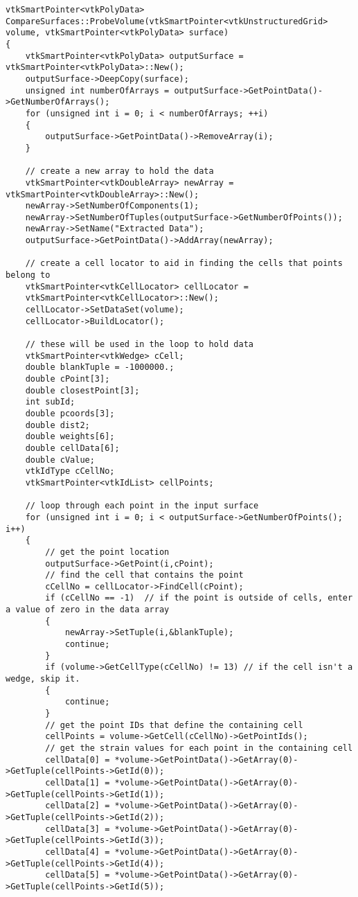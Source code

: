 \begin{lstlisting}
vtkSmartPointer<vtkPolyData> CompareSurfaces::ProbeVolume(vtkSmartPointer<vtkUnstructuredGrid> volume, vtkSmartPointer<vtkPolyData> surface)
{
    vtkSmartPointer<vtkPolyData> outputSurface = vtkSmartPointer<vtkPolyData>::New();
    outputSurface->DeepCopy(surface);
    unsigned int numberOfArrays = outputSurface->GetPointData()->GetNumberOfArrays();
    for (unsigned int i = 0; i < numberOfArrays; ++i)
    {
        outputSurface->GetPointData()->RemoveArray(i);
    }

    // create a new array to hold the data
    vtkSmartPointer<vtkDoubleArray> newArray = vtkSmartPointer<vtkDoubleArray>::New();
    newArray->SetNumberOfComponents(1);
    newArray->SetNumberOfTuples(outputSurface->GetNumberOfPoints());
    newArray->SetName("Extracted Data");
    outputSurface->GetPointData()->AddArray(newArray);

    // create a cell locator to aid in finding the cells that points belong to
    vtkSmartPointer<vtkCellLocator> cellLocator =
    vtkSmartPointer<vtkCellLocator>::New();
    cellLocator->SetDataSet(volume);
    cellLocator->BuildLocator();

    // these will be used in the loop to hold data
    vtkSmartPointer<vtkWedge> cCell;
    double blankTuple = -1000000.;
    double cPoint[3];
    double closestPoint[3];
    int subId;
    double pcoords[3];
    double dist2;
    double weights[6];
    double cellData[6];
    double cValue;
    vtkIdType cCellNo;
    vtkSmartPointer<vtkIdList> cellPoints;

    // loop through each point in the input surface
    for (unsigned int i = 0; i < outputSurface->GetNumberOfPoints(); i++)
    {
        // get the point location
        outputSurface->GetPoint(i,cPoint);
        // find the cell that contains the point
        cCellNo = cellLocator->FindCell(cPoint);
        if (cCellNo == -1)  // if the point is outside of cells, enter a value of zero in the data array
        {
            newArray->SetTuple(i,&blankTuple);
            continue;
        }
        if (volume->GetCellType(cCellNo) != 13) // if the cell isn't a wedge, skip it.
        {
            continue;
        }
        // get the point IDs that define the containing cell
        cellPoints = volume->GetCell(cCellNo)->GetPointIds();
        // get the strain values for each point in the containing cell
        cellData[0] = *volume->GetPointData()->GetArray(0)->GetTuple(cellPoints->GetId(0));
        cellData[1] = *volume->GetPointData()->GetArray(0)->GetTuple(cellPoints->GetId(1));
        cellData[2] = *volume->GetPointData()->GetArray(0)->GetTuple(cellPoints->GetId(2));
        cellData[3] = *volume->GetPointData()->GetArray(0)->GetTuple(cellPoints->GetId(3));
        cellData[4] = *volume->GetPointData()->GetArray(0)->GetTuple(cellPoints->GetId(4));
        cellData[5] = *volume->GetPointData()->GetArray(0)->GetTuple(cellPoints->GetId(5));


\end{lstlisting}
